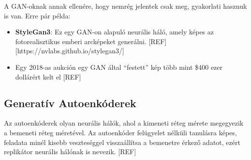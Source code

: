 

A GAN-oknak annak ellenére, hogy nemrég jelentek csak meg, gyakorlati hasznuk is van. Erre pár példa:
\begin{itemize}
	\item \textbf{StyleGan3}: Ez egy GAN-on alapuló neurális háló, amely képes az fotorealisztikus emberi arcképeket generálni. [REF] [https://nvlabs.github.io/stylegan3/]
	\item Egy 2018-as aukción egy GAN által ``festett'' kép több mint \$400 ezer dollárért kelt el [REF]
\end{itemize}

\subsection{Generatív Autoenkóderek}

Az autoenkóderek olyan neurális hálók, ahol a kimeneti réteg mérete megegyezik a bemeneti réteg méretével. Az autoenkóder felügyelet nélküli tanulásra képes, feladata minél kisebb veszteséggel visszaállítsa a bemenetre érkező adatot, ezért replikátor neurális hálónak is nevezik. [REF]

